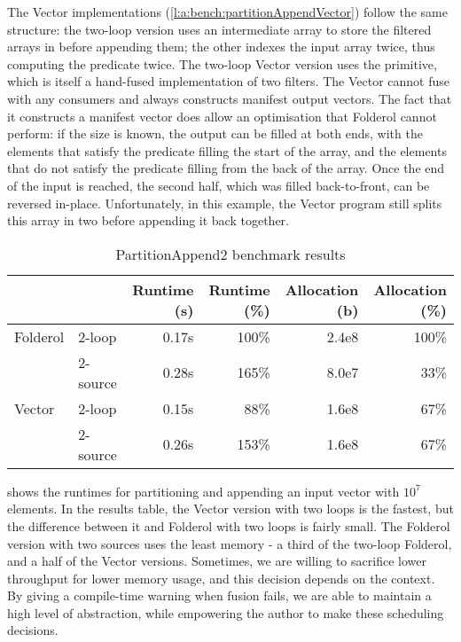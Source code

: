 The Vector implementations (\cref{l:a:bench:partitionAppendVector}) follow the same structure: the two-loop version uses an intermediate array to store the filtered arrays in before appending them; the other indexes the input array twice, thus computing the predicate twice.
The two-loop Vector version uses the \Hs@partition@ primitive, which is itself a hand-fused implementation of two filters.
The Vector \Hs@partition@ cannot fuse with any consumers and always constructs manifest output vectors.
The fact that it constructs a manifest vector does allow an optimisation that Folderol cannot perform: if the size is known, the output can be filled at both ends, with the elements that satisfy the predicate filling the start of the array, and the elements that do not satisfy the predicate filling from the back of the array.
Once the end of the input is reached, the second half, which was filled back-to-front, can be reversed in-place.
Unfortunately, in this example, the Vector program still splits this array in two before appending it back together.

\begin{table}
\begin{center}
\begin{tabular}{ll|rrrr}
& & Runtime (s)  & Runtime (\%) & Allocation (b) & Allocation (\%) \\
\hline
Folderol & 2-loop   & 0.17s &   100\% & 2.4e8 & 100\% \\
         & 2-source & 0.28s &   165\% & 8.0e7 &  33\% \\
Vector   & 2-loop   & 0.15s &    88\% & 1.6e8 &  67\% \\
         & 2-source & 0.26s &   153\% & 1.6e8 &  67\% \\
\end{tabular}
\end{center}
\caption[PartitionAppend2 benchmark results]{PartitionAppend2 benchmark results}
\label{table:bench:part2app2}
\end{table}

 shows the runtimes for partitioning and appending an input vector with $10^7$ elements.
In the results table, the Vector version with two loops is the fastest, but the difference between it and Folderol with two loops is fairly small.
The Folderol version with two sources uses the least memory - a third of the two-loop Folderol, and a half of the Vector versions.
Sometimes, we are willing to sacrifice lower throughput for lower memory usage, and this decision depends on the context.
By giving a compile-time warning when fusion fails, we are able to maintain a high level of abstraction, while empowering the author to make these scheduling decisions.

